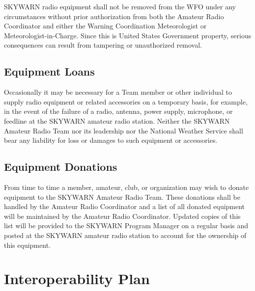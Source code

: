 \documentclass[pdflatex,letterpaper,twoside,12pt]{book}
\begin{document}
SKYWARN radio equipment shall not be removed from the WFO under any circumstances without prior authorization from both the Amateur Radio Coordinator and either the Warning Coordination Meteorologist or Meteorologist-in-Charge.  Since this is United States Government property, serious consequences can result from tampering or unauthorized removal.


\section{Equipment Loans}

Occasionally it may be necessary for a Team member or other individual to supply radio equipment or related accessories on a temporary basis, for example, in the event of the failure of a radio, antenna, power supply, microphone, or feedline at the SKYWARN amateur radio station.  Neither the SKYWARN Amateur Radio Team nor its leadership nor the National Weather Service shall bear any liability for loss or damages to such equipment or accessories. 


\section{Equipment Donations}

From time to time a member, amateur, club, or organization may wish to donate equipment to the SKYWARN Amateur Radio Team.  These donations shall be handled by the Amateur Radio Coordinator and a list of all donated equipment will be maintained by the Amateur Radio Coordinator. Updated copies of this list will be provided to the SKYWARN Program Manager on a regular basis and posted at the SKYWARN amateur radio station to account for the ownership of this equipment.


\chapter{Interoperability Plan}
\end{document}
